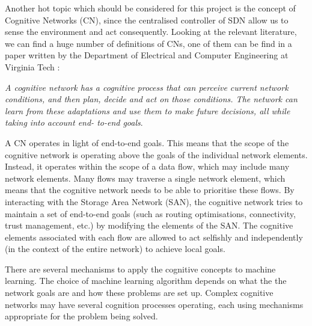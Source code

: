 Another hot topic which should be considered for this project is the concept of Cognitive Networks (CN), since the centralised controller of SDN allow us to sense the environment and act consequently. Looking at the relevant literature, we can find a huge number of definitions of CNs, one of them can be find in a paper written by the Department of Electrical and Computer Engineering at Virginia Tech \cite{cognet-virginia}:

\emph{A cognitive network has a cognitive process that can perceive current network conditions, and then plan, decide and act on those conditions. The network can learn from these adaptations and use them to make future decisions, all while taking into account end- to-end goals}.


A CN operates in light of end-to-end goals. This means that the scope of the cognitive network is operating above the goals of the individual network elements. Instead, it operates within the scope of a data flow, which may include many network elements. Many flows may traverse a single network element, which means that the cognitive network needs to be able to prioritise these flows. By interacting with the Storage Area Network (SAN), the cognitive network tries to maintain a set of end-to-end goals (such as routing optimisations, connectivity, trust management, etc.) by modifying the elements of the SAN. The cognitive elements associated with each flow are allowed to act selfishly and independently (in the context of the entire network) to achieve local goals.

There are several mechanisms to apply the cognitive concepts to machine learning. The choice of machine learning algorithm depends on what the the network goals are and how these problems are set up. Complex cognitive networks may have several cognition processes operating, each using mechanisms appropriate for the problem being solved.




